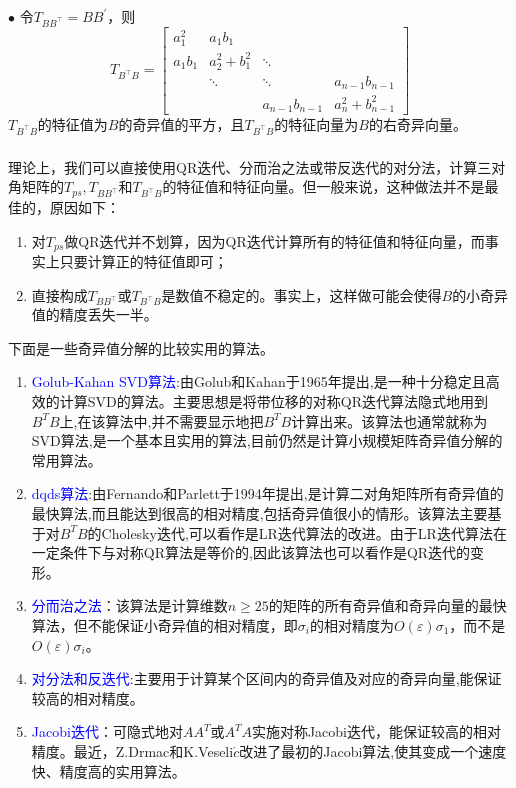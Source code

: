 \documentclass[notheorems,serif]{beamer}
\begin{document}
\begin{frame}
$\bullet$ 令$T_{B B^{\top}}=B B^{\prime}$，则$$
	T_{B^{\top} B}=\left[\begin{array}{cccc}{a_{1}^{2}} & {a_{1} b_{1}} \\ {a_{1} b_{1}} & {a_{2}^{2}+b_{1}^{2}} & {\ddots} \\ {} & {\ddots} & {\ddots} & {a_{n-1} b_{n-1}} \\ {} & {} & {a_{n-1} b_{n-1}} & {a_{n}^{2}+b_{n-1}^{2}}\end{array}\right]
	$$
	$T_{B^{\top} B}$的特征值为$B$的奇异值的平方，且$T_{B^{\top} B}$的特征向量为$B$的右奇异向量。
\end{frame}

\begin{frame}
\frametitle{}
理论上，我们可以直接使用QR迭代、分而治之法或带反迭代的对分法，计算三对角矩阵的$T_{p s}, T_{B B^{\top}}$和$T_{B^{\top} B}$的特征值和特征向量。但一般来说，这种做法并不是最佳的，原因如下：
\begin{enumerate}[(1)]
	\item 对$T_{p s}$做QR迭代并不划算，因为QR迭代计算所有的特征值和特征向量，而事实上只要计算正的特征值即可；
	\item 直接构成$T_{B B^{\top}}$或$T_{B^{\top} B}$是数值不稳定的。事实上，这样做可能会使得$B$的小奇异值的精度丢失一半。
\end{enumerate}
\end{frame}

\begin{frame}
下面是一些奇异值分解的比较实用的算法。
\begin{enumerate}[1.]
	\item \textcolor{blue}{Golub-Kahan SVD算法}:由Golub和Kahan于1965年提出,是一种十分稳定且高效的计算SVD的算法。主要思想是将带位移的对称QR迭代算法隐式地用到$B^TB$上,在该算法中,并不需要显示地把$B^TB$计算出来。该算法也通常就称为SVD算法,是一个基本且实用的算法,目前仍然是计算小规模矩阵奇异值分解的常用算法。
	\item \textcolor{blue}{dqds算法}:由Fernando和Parlett于1994年提出,是计算二对角矩阵所有奇异值的最快算法,而且能达到很高的相对精度,包括奇异值很小的情形。该算法主要基于对$B^TB$的Cholesky迭代,可以看作是LR迭代算法的改进。由于LR迭代算法在一定条件下与对称QR算法是等价的,因此该算法也可以看作是QR迭代的变形。
	\item \textcolor{blue}{分而治之法}：该算法是计算维数$n \geq 25$的矩阵的所有奇异值和奇异向量的最快算法，但不能保证小奇异值的相对精度，即$\sigma_{i}$的相对精度为$O(\varepsilon) \sigma_{1}$，而不是$O(\varepsilon) \sigma_{i}$。
	\item \textcolor{blue}{对分法和反迭代}:主要用于计算某个区间内的奇异值及对应的奇异向量,能保证较高的相对精度。
	\item \textcolor{blue}{Jacobi迭代}：可隐式地对$AA^T$或$A^TA$实施对称Jacobi迭代，能保证较高的相对精度。最近，Z.Drmac和K.Veseli$\acute{c}$改进了最初的Jacobi算法,使其变成一个速度快、精度高的实用算法。
\end{enumerate}
\end{frame}
\end{document}

